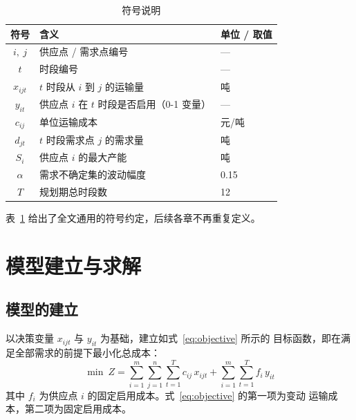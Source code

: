 \documentclass[12pt,a4paper]{ctexart}
\begin{document}
\begin{table}[htbp]
  \centering
  \caption{符号说明}
  \label{tab:notation}
  \begin{tabular}{cll}
    \toprule
    \textbf{符号} & \textbf{含义} & \textbf{单位 / 取值} \\
    \midrule
    $i,\ j$        & 供应点 / 需求点编号                & ---            \\
    $t$            & 时段编号                           & ---            \\
    $x_{ijt}$      & $t$ 时段从 $i$ 到 $j$ 的运输量     & 吨             \\
    $y_{it}$       & 供应点 $i$ 在 $t$ 时段是否启用（0-1 变量） & ---      \\
    $c_{ij}$       & 单位运输成本                       & 元/吨          \\
    $d_{jt}$       & $t$ 时段需求点 $j$ 的需求量        & 吨             \\
    $S_i$          & 供应点 $i$ 的最大产能              & 吨             \\
    $\alpha$       & 需求不确定集的波动幅度             & 0.15           \\
    $T$            & 规划期总时段数                     & 12             \\
    \bottomrule
  \end{tabular}
\end{table}

表~\ref{tab:notation} 给出了全文通用的符号约定，后续各章不再重复定义。

\section{模型建立与求解}
\label{sec:model}

\subsection{模型的建立}

以决策变量 $x_{ijt}$ 与 $y_{it}$ 为基础，建立如式~\eqref{eq:objective} 所示的
目标函数，即在满足全部需求的前提下最小化总成本：
\begin{equation}
  \min\ Z=\sum_{i=1}^{m}\sum_{j=1}^{n}\sum_{t=1}^{T} c_{ij}\,x_{ijt}
            +\sum_{i=1}^{m}\sum_{t=1}^{T} f_i\,y_{it}
  \label{eq:objective}
\end{equation}
其中 $f_i$ 为供应点 $i$ 的固定启用成本。式~\eqref{eq:objective} 的第一项为变动
运输成本，第二项为固定启用成本。
\end{document}
